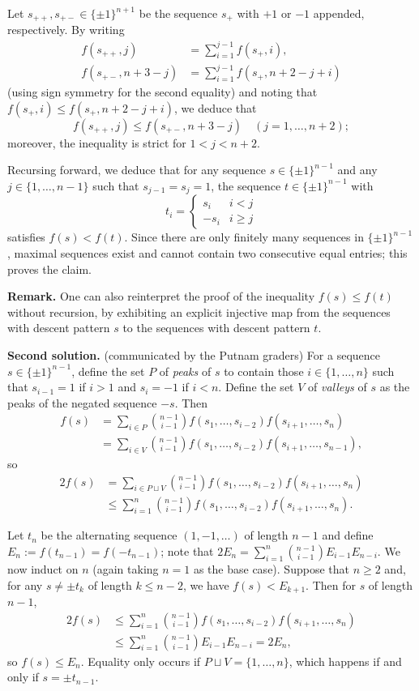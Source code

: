 \documentclass[amssymb,twocolumn,pra,10pt,aps]{revtex4-1}
\begin{document}
\begin{itemize}
Let $s_{++}, s_{+-} \in \{\pm 1\}^{n+1}$ be the sequence $s_+$ with $+1$ or $-1$ appended, respectively. By writing
\begin{align*}
f(s_{++},j) &= \sum_{i=1}^{j-1} f(s_+, i),\\
f(s_{+-},n+3-j) &= \sum_{i=1}^{j-1} f(s_+, n+2-j+i)
\end{align*}
(using sign symmetry for the second equality)
and noting that $f(s_+, i) \leq f(s_+, n+2-j+i)$, we deduce that
\[
f(s_{++}, j) \leq f(s_{+-}, n+3-j) \quad (j=1,\dots,n+2);
\]
moreover, the inequality is strict for $1 < j < n+2$.

Recursing forward, we deduce that for any sequence $s \in \{\pm 1\}^{n-1}$ and any $j \in \{1,\dots,n-1\}$
such that $s_{j-1} = s_j = 1$, the sequence $t \in \{\pm 1\}^{n-1}$ with
\[
t_i = \begin{cases} s_i & i < j \\
-s_i & i \geq j
\end{cases}
\]
satisfies $f(s) < f(t)$. Since there are only finitely many sequences in $\{\pm 1\}^{n-1}$, maximal sequences exist and cannot contain two consecutive equal entries; this proves the claim.

\noindent
\textbf{Remark.}
One can also reinterpret the proof of the inequality $f(s) \leq f(t)$ without recursion, by exhibiting an explicit injective map from the sequences with descent pattern $s$ to the sequences with descent pattern $t$.

\noindent
\textbf{Second solution.} (communicated by the Putnam graders)
For a sequence $s \in \{\pm 1\}^{n-1}$, define the set $P$ of \emph{peaks} of $s$ 
to contain those $i \in \{1,\dots,n\}$ such that $s_{i-1} = 1$ if $i > 1$ and $s_i = -1$ if $i < n$.
Define the set $V$ of \emph{valleys} of $s$ as the peaks of the negated sequence $-s$. Then
\begin{align*}
f(s)&=\sum_{i\in P}\binom{n-1}{i-1}f(s_1,\dots,s_{i-2})f(s_{i+1},\dots,s_n)\\
&=\sum_{i\in V}\binom{n-1}{i-1}f(s_1,\dots,s_{i-2})f(s_{i+1},\dots,s_{n-1}),
\end{align*}
so
\begin{align*}
2f(s)&=\sum_{i\in P\sqcup V}\binom{n-1}{i-1}f(s_1,\dots,s_{i-2})f(s_{i+1},\dots,s_n)\\
&\le\sum_{i=1}^{n}\binom{n-1}{i-1}f(s_1,\dots,s_{i-2})f(s_{i+1},\dots,s_n).
\end{align*}

Let $t_n$ be the alternating sequence $(1,-1,\dots)$ of length $n-1$ and define $E_n := f(t_{n-1}) = f(-t_{n-1})$; note that $2E_n=\sum_{i=1}^{n}\binom{n-1}{i-1}E_{i-1}E_{n-i}$.
We now induct on $n$ (again taking $n=1$ as the base case).
Suppose that $n \geq 2$ and, for any $s\ne\pm t_{k}$ of length $k\le n-2$, we have $f(s)<E_{k+1}$. 
Then for $s$ of length $n-1$,
\begin{align*}
2f(s) &\le\sum_{i=1}^{n}\binom{n-1}{i-1}f(s_1,\dots,s_{i-2})f(s_{i+1},\dots,s_n) \\
&\le\sum_{i=1}^{n}\binom{n-1}{i-1}E_{i-1}E_{n-i}=2E_n,
\end{align*}
so $f(s)\le E_n$. Equality only occurs if $P\sqcup V=\{1,\dots,n\}$, which happens if and only if $s=\pm t_{n-1}$.


\end{itemize}
\end{document}
